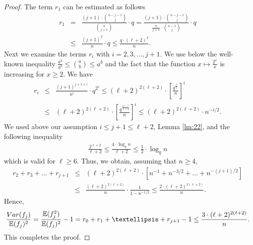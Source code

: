 \documentclass[10pt,a4paper]{amsart}
\newcommand{\E}{\mathbb{E}}
\begin{document}
\begin{proof}
The term $r_1$ can be estimated as follows
\begin{eqnarray*}\label{eq:r1}
r_1&=& \frac{(j+1)\cdot \binom {n-j -1}{j}}{\binom n {j+1} } \cdot q = \frac{(j+1)\cdot \binom {n-j -1}{j}}{\frac{n}{j+1} \cdot \binom {n-1} j  }\cdot q \nonumber \\
&\le & \frac{(j+1)^{2}}{n}\cdot q\le \frac{q\cdot (\ell+2)^{2}}{n}.
\end{eqnarray*}
Next we examine the terms $r_i$ with $i=2, 3, \dots, j+1$. 
We use below the well-known inequality
$
\frac{a^b}{b^b}\le \binom a b\le a^b
$
and the fact that the function $x\mapsto \frac{2^x}{x}$ is increasing for $x\ge 2$. We have
\begin{eqnarray*}
r_i&\le& \frac{(j+1)^{j+1+i}}{n^i}\cdot q^{2^i}
\le (\ell+2)^{2(\ell+2)}\cdot \left[\frac{q^{\frac{2^i}{i}}}{n}\right]^i \\
&\le & (\ell+2)^{2(\ell+2)}\cdot \left[\frac{q^{\frac{2^{\ell+2}}{\ell+2}}}{n}\right]^i 
\le  
(\ell+2)^{2(\ell+2)}\cdot n^{-i/2}.
\end{eqnarray*}
We used above our assumption $i\le j+1\le \ell+2$, Lemma \ref{lm:22}, and the following inequality 
\begin{eqnarray*}\label{eq:beta-1}
\frac{2^{\ell+2}}{\ell+2}\le  \frac{4\cdot\log_q n}{\ell+2} \le 
\frac{1}{2}\cdot \log_qn
\end{eqnarray*}
which is valid for $\ell\ge 6$. 
Thus, we obtain, assuming that $n\ge 4$, 
\begin{eqnarray*}
r_2+r_3+\dots+r_{j+1} &\le & (\ell+2)^{2(\ell+2)}\cdot \left[n^{-1}+n^{-3/2}+\dots+n^{-(j+1)/2}\right]\nonumber \\
&\le& \frac{(\ell+2)^{2(\ell+2)}}{n}\cdot \frac{1}{1-n^{-1/2}}\le \frac{2\cdot (\ell+2)^{2(\ell+2)}}{n}.\label{eq:ri}
\end{eqnarray*}
Hence, 
$$
\frac{{{\rm {Var}}(f_j)}}{\mathbb E(f_j)^2}=\frac{\E(f_j^2)}{\E(f_j)^2} -1 = r_0+r_1+\dots+r_{j+1}-1 \le \frac{3\cdot (\ell+2)^{2(\ell+2)}}{n}.
$$
This completes the proof. 
\end{proof}
\end{document}
